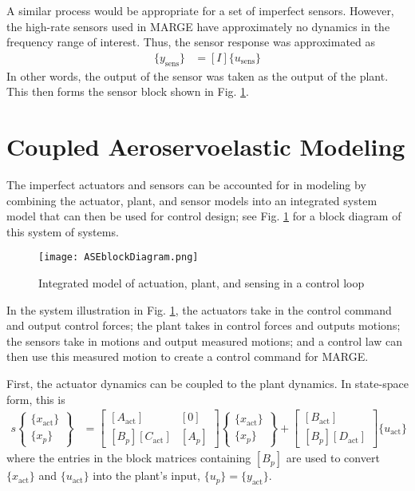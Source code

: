 A similar process would be appropriate for a set of imperfect sensors. However, the high-rate sensors used in MARGE have approximately no dynamics in the frequency range of interest. Thus, the sensor response was approximated as
\begin{align}
    \{y_\text{sens}\} &= [I] \{u_\text{sens}\}
\end{align}
In other words, the output of the sensor was taken as the output of the plant. This then forms the sensor block shown in Fig. \ref{fig:actPlantSens}.

\section{Coupled Aeroservoelastic Modeling} %

The imperfect actuators and sensors can be accounted for in modeling by combining the actuator, plant, and sensor models into an integrated system model that can then be used for control design; see Fig. \ref{fig:actPlantSens} for a block diagram of this system of systems.
\begin{figure}[h]
    \centering
    \texttt{[image: ASEblockDiagram.png]}
    \caption{Integrated model of actuation, plant, and sensing in a control loop}
    \label{fig:actPlantSens}
\end{figure}
In the system illustration in Fig. \ref{fig:actPlantSens}, the actuators take in the control command and output control forces; the plant takes in control forces and outputs motions; the sensors take in motions and output measured motions; and a control law can then use this measured motion to create a control command for MARGE.

First, the actuator dynamics can be coupled to the plant dynamics. In state-space form, this is
\begin{align}
	\label{eq:coupledState}
	s \begin{Bmatrix} \{x_\text{act}\} \\ \{x_p\} \end{Bmatrix} &= \begin{bmatrix}
		[A_\text{act}] & [0] \\
		[B_p] [C_\text{act}] & [A_p]
	\end{bmatrix} \begin{Bmatrix} \{x_\text{act}\} \\ \{x_p\} \end{Bmatrix}
	+ \begin{bmatrix} [B_\text{act}] \\ [B_p][D_\text{act}] \end{bmatrix} \{u_\text{act}\}
\end{align}
where the entries in the block matrices containing $[B_p]$ are used to convert $\{x_\text{act}\}$ and $\{u_\text{act}\}$ into the plant's input, $\{u_p\}=\{y_\text{act}\}$.

